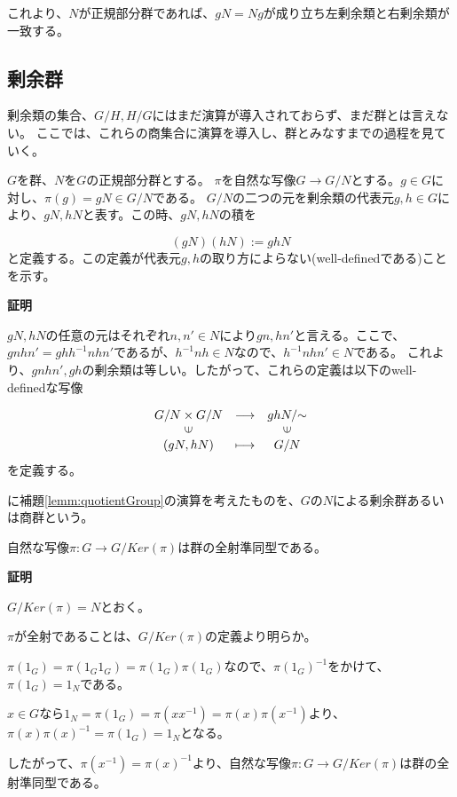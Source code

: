 \documentclass[dvipdfmx,autodetect-engine]{jsarticle}
\begin{document}
これより、$N$が正規部分群であれば、$gN = Ng$が成り立ち左剰余類と右剰余類が一致する。

\subsection{剰余群}

剰余類の集合、$G/H, H/G$にはまだ演算が導入されておらず、まだ群とは言えない。
ここでは、これらの商集合に演算を導入し、群とみなすまでの過程を見ていく。

\label{lemm:quotientGroup}

$G$を群、$N$を$G$の正規部分群とする。
$\pi$を自然な写像$G \to G/N$とする。$g \in G$に対し、$\pi(g) = gN \in G/N$である。
$G/N$の二つの元を剰余類の代表元$g, h \in G$により、$gN, hN$と表す。この時、$gN, hN$の積を

$$
(gN)(hN) := ghN
$$
と定義する。この定義が代表元$g, h$の取り方によらない(well-definedである)ことを示す。

{\bf 証明}

$gN, hN$の任意の元はそれぞれ$n, n' \in N$により$gn, hn'$と言える。ここで、$gnhn' = ghh^{-1}nhn'$であるが、$h^{-1}nh \in N$なので、$h^{-1}nhn' \in N$である。
これより、$gnhn', gh$の剰余類は等しい。したがって、これらの定義は以下のwell-definedな写像

$$
\begin{array}{ccc}
G/N \times G/N & {\longrightarrow} & ghN/{\sim} \\
\rotatebox{90}{$\in$} & & \rotatebox{90}{$\in$} \\
(gN, hN) & \longmapsto & G/N
\end{array}
$$
を定義する。

に補題\ref{lemm:quotientGroup}の演算を考えたものを、$G$の$N$による剰余群あるいは商群という。

\prop 自然な写像$\pi: G \to G/Ker(\pi)$は群の全射準同型である。

{\bf 証明}

$G/Ker(\pi) = N$とおく。

$\pi$が全射であることは、$G/Ker(\pi)$の定義より明らか。

$\pi(1_G) = \pi(1_G1_G) = \pi(1_G)\pi(1_G)$なので、$\pi(1_G)^{-1}$をかけて、$\pi(1_G) = 1_N$である。

$x \in G$なら$1_N = \pi(1_G) = \pi(xx^{-1}) = \pi(x)\pi(x^{-1})$より、$\pi(x)\pi(x)^{-1} = \pi(1_G) = 1_N$となる。

したがって、$\pi(x^{-1}) = \pi(x)^{-1}$より、自然な写像$\pi: G \to G/Ker(\pi)$は群の全射準同型である。
\end{document}
